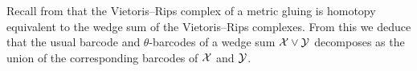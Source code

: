 
\subsubsection{}\label{prop:wedge sum}
Recall from \cite[Proposition 1 \& Corollary 2]{adamaszek2020homotopy} that the Vietoris--Rips complex of a metric gluing is homotopy equivalent to the wedge sum of the Vietoris--Rips complexes.
From this we deduce that the usual barcode and $\theta$-barcodes of a wedge sum $\mathcal{X} \vee \mathcal{Y}$ decomposes as the union of the corresponding barcodes of $\mathcal{X}$ and $\mathcal{Y}$.


%	

\subsubsection{}

